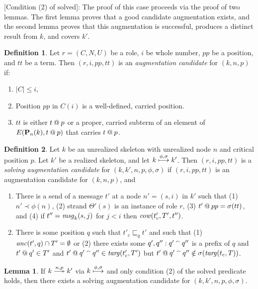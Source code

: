 \documentclass[12pt]{article}
\theoremstyle{definition}
\newtheorem{defn}{Definition}[section]
\newtheorem{lem}{Lemma}[section]
\newcommand{\solve}[1]{\stackrel{#1}{\longtwoheadrightarrow}}
\newcommand{\pubmsg}{\mathbf{P}}
\newcommand{\anc}{\fn{anc}}
\newcommand{\mcow}{\fn{cow}}
\newcommand{\msg}{\fn{msg}}
\begin{document}
[Condition (2) of solved]:  The proof of this case proceeds via the proof of two lemmas.  The first lemma proves that
a good candidate augmentation exists, and the second lemma proves that this augmentation is successful, produces a distinct
result from $k$, and covers $k'$.

\begin{defn}
Let $r = (C,N,U)$ be a role, $i$ be whole number, $pp$ be a position, and $tt$ be a term.  Then $(r,i,pp,tt)$ is an {\em augmentation
candidate} for $(k,n,p)$ if:
\begin{enumerate}
\item $|C| \leq i$,
\item Position $pp$ in $C(i)$ is a well-defined, carried position.
\item $tt$ is either $t \mathbin{@} p$ or a proper, carried subterm of an element of $E(\pubmsg_n(k),t \termat p)$ that carries $t \mathbin{@} p$.
\end{enumerate}
\end{defn}

\begin{defn}
Let $k$ be an unrealized skeleton with unrealized node $n$ and critical position $p$.  Let $k'$ be a realized
skeleton, and let $k \stackrel{\phi,\sigma}{\longmapsto} k'$.  Then $(r,i,pp,tt)$ is a {\em solving augmentation
candidate} for $(k,k',n,p,\phi,\sigma)$ if $(r,i,pp,tt)$ is an augmentation candidate for $(k,n,p)$, and
\begin{enumerate}
\item There is a send of a message $t'$ at a node $n' = (s, i)$ in $k'$ such
that (1) $n' \prec \phi(n)$, (2) strand $\Theta'(s)$ is an instance of role $r$,
(3) $t' \mathbin{@} pp = \sigma(tt)$, and (4) if $t'' = \msg_k(s,j)$ for $j < i$ then $\mcow(t'_c,T',t'')$.
\item There is some position $q$ such that $t'_c \sqsubseteq_{q} t'$ and such that (1) $\anc(t',q) \cap T' =
\emptyset$ or (2) there exists some $q', q'': q' \mathbin{{}^\smallfrown} q''$ is a prefix of $q$ and $t' \mathbin{@} q' \in T'$
and $t' \mathbin{@} q' \mathbin{{}^\smallfrown} q'' \in \operatorname{\mathit{targ}}(t'_c,T')$ but $t' \mathbin{@} q' \mathbin{{}^\smallfrown} q'' \notin \sigma(\operatorname{\mathit{targ}}(t_c,T))$.
\end{enumerate}
\end{defn}

\begin{lem}
\label{lem:candidate}
If $k\solve{n,p}k'$ via $k \stackrel{\phi,\sigma}{\longmapsto}$ and only condition (2) of the solved predicate
holds, then there exists a solving augmentation candidate for $(k,k',n,p,\phi,\sigma)$.
\end{lem}
\end{document}
